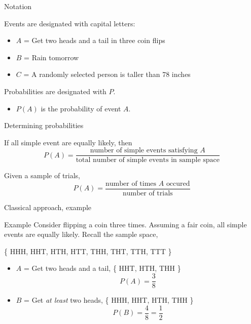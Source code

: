 \documentclass[xcolor=table, handout]{beamer}
\begin{document}
\begin{frame}{Notation}
\begin{block}{}
Events are designated with capital letters:
\pause
\begin{itemize}
\item $A$ = Get two heads and a tail in three coin flips
\item $B$ = Rain tomorrow
\item $C$ = A randomly selected person is taller than 78 inches
\end{itemize}
\end{block}

\begin{block}{}
Probabilities are designated with $P$.
\pause
\begin{itemize}
\item $P(A)$ is the probability of event $A$.
\end{itemize}
\end{block}
\end{frame}

\begin{frame}{Determining probabilities}
\begin{block}{}
 If all simple event are equally likely, then
\[P(A) = \frac{\text{number of simple events satisfying } A}{\text{total number of simple events in sample space}}\] 
\end{block}

\pause

\begin{block}{}
 Given a sample of trials,
\[P(A) = \frac{\text{number of times } A \text{ occured}}{\text{number of trials}}\]
\end{block}

\end{frame}

\begin{frame}{Classical approach, example}
\begin{exampleblock}{Example}
Consider flipping a coin three times. Assuming a fair coin, all simple events are equally likely. Recall the sample space,\\
\smallskip
{\centering
\{ HHH, HHT, HTH, HTT, THH, THT, TTH, TTT \} \par
}
\begin{itemize}
\pause
\item $A$ = Get two heads and a tail, \{ HHT, HTH, THH \}
\pause
\[ P(A) = \frac 3 8\]

\pause
\item $B$ = Get \emph{at least} two heads,  \{ HHH,  HHT, HTH, THH \}
\pause
\[ P(B) = \frac 4 8 = \frac 1 2\]
\end{itemize}
\end{exampleblock}
\end{frame}
\end{document}
